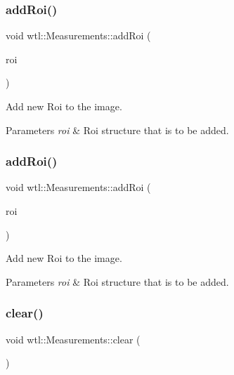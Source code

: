 \subsubsection{\texorpdfstring{add\+Roi()}{addRoi()}\hspace{0.1cm}{\footnotesize\ttfamily [1/2]}}
{\footnotesize\ttfamily void wtl\+::\+Measurements\+::add\+Roi (\begin{DoxyParamCaption}\item[{std\+::shared\+\_\+ptr$<$ \hyperlink{structwtl_1_1_roi_struct}{Roi\+Struct} $>$}]{roi }\end{DoxyParamCaption})}



Add new Roi to the image. 


\begin{DoxyParams}{Parameters}
{\em roi} & Roi structure that is to be added. \\
\hline
\end{DoxyParams}
\mbox{\label{classwtl_1_1_measurements_ab0ea1cd53b62e0f86ad27761208832a6}} 
\subsubsection{\texorpdfstring{add\+Roi()}{addRoi()}\hspace{0.1cm}{\footnotesize\ttfamily [2/2]}}
{\footnotesize\ttfamily void wtl\+::\+Measurements\+::add\+Roi (\begin{DoxyParamCaption}\item[{const \hyperlink{structwtl_1_1_roi_struct}{Roi\+Struct} \&}]{roi }\end{DoxyParamCaption})}



Add new Roi to the image. 


\begin{DoxyParams}{Parameters}
{\em roi} & Roi structure that is to be added. \\
\hline
\end{DoxyParams}
\mbox{\label{classwtl_1_1_measurements_abc23cb0e4c6b6dbae6637dad635171f9}} 
\subsubsection{\texorpdfstring{clear()}{clear()}}
{\footnotesize\ttfamily void wtl\+::\+Measurements\+::clear (\begin{DoxyParamCaption}{ }\end{DoxyParamCaption})}



